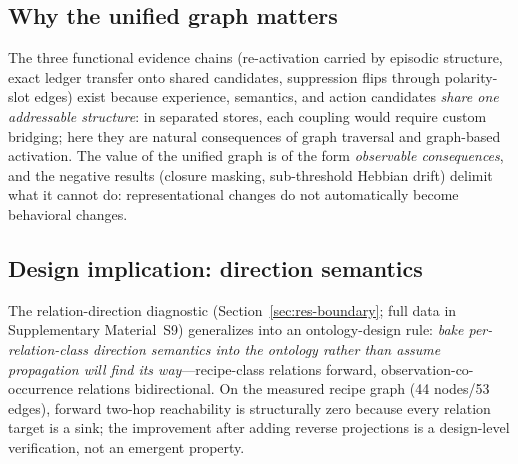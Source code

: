 \documentclass[10pt]{article}
\begin{document}
\subsection{Why the unified graph matters}
The three functional evidence chains (re-activation carried by episodic structure, exact ledger transfer onto shared candidates, suppression flips through polarity-slot edges) exist because experience, semantics, and action candidates \emph{share one addressable structure}: in separated stores, each coupling would require custom bridging; here they are natural consequences of graph traversal and graph-based activation. The value of the unified graph is of the form \emph{observable consequences}, and the negative results (closure masking, sub-threshold Hebbian drift) delimit what it cannot do: representational changes do not automatically become behavioral changes.

\subsection{Design implication: direction semantics}
The relation-direction diagnostic (Section~\ref{sec:res-boundary}; full data in Supplementary Material~S9) generalizes into an ontology-design rule: \emph{bake per-relation-class direction semantics into the ontology rather than assume propagation will find its way}---recipe-class relations forward, observation-co-occurrence relations bidirectional. On the measured recipe graph (44 nodes/53 edges), forward two-hop reachability is structurally zero because every relation target is a sink; the improvement after adding reverse projections is a design-level verification, not an emergent property.
\end{document}
